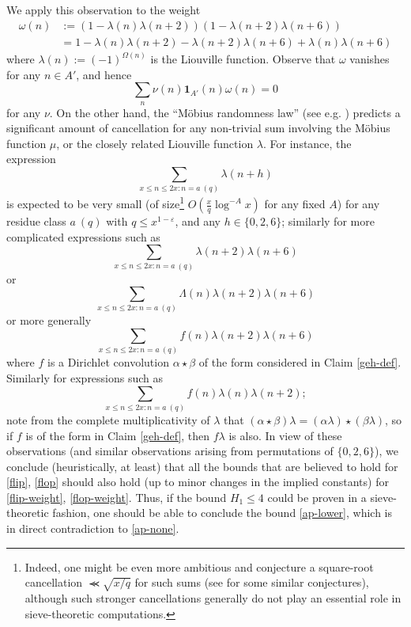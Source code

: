 \documentclass{bmcart}
\theoremstyle{plain}
\theoremstyle{definition}
\newcommand\eps{\varepsilon}
\renewcommand{\lessapprox}{\llcurly}
\newcommand{\onef}{\mathbf{1}}
\begin{document}
We apply this observation to the weight
\begin{align*}
\omega(n) &:= (1 - \lambda(n) \lambda(n+2)) (1 - \lambda(n+2) \lambda(n+6)) \\
&=  1 - \lambda(n)\lambda(n+2) - \lambda(n+2)\lambda(n+6) + \lambda(n) \lambda(n+6)
\end{align*}
where $\lambda(n) := (-1)^{\Omega(n)}$ is the Liouville function.  Observe that $\omega$ vanishes for any $n\in A'$, and hence
\begin{equation}\label{ap-none}
\sum_n \nu(n) \onef_{A'}(n) \omega(n) = 0
\end{equation}
for any $\nu$.  On the other hand, the ``M\"obius randomness law'' (see e.g. \cite{ik}) predicts a significant amount of cancellation for any non-trivial sum involving the M\"obius function $\mu$, or the closely related Liouville function $\lambda$.  For instance, the expression
$$ \sum_{x \leq n \leq 2x: n = a\ (q)} \lambda(n+h)$$
is expected to be very small (of size\footnote{Indeed, one might be even more ambitious and conjecture a square-root cancellation $\lessapprox \sqrt{x/q}$ for such sums (see \cite{mont} for some similar conjectures), although such stronger cancellations generally do not play an essential role in sieve-theoretic computations.} $O( \frac{x}{q} \log^{-A} x)$ for any fixed $A$) for any residue class $a\ (q)$ with $q \leq x^{1-\eps}$, and any $h \in \{0,2,6\}$; similarly for more complicated expressions such as
$$ \sum_{x \leq n \leq 2x: n = a\ (q)} \lambda(n+2) \lambda(n+6)$$
or
$$ \sum_{x \leq n \leq 2x: n = a\ (q)} \Lambda(n) \lambda(n+2) \lambda(n+6)$$
or more generally
$$ \sum_{x \leq n \leq 2x: n = a\ (q)} f(n) \lambda(n+2) \lambda(n+6)$$
where $f$ is a Dirichlet convolution $\alpha \star \beta$ of the form considered in Claim \ref{geh-def}.  Similarly for expressions such as
$$ \sum_{x \leq n \leq 2x: n = a\ (q)} f(n) \lambda(n) \lambda(n+2);$$
note from the complete multiplicativity of $\lambda$ that $(\alpha \star \beta) \lambda = (\alpha \lambda) \star (\beta \lambda)$, so if $f$ is of the form in Claim \ref{geh-def}, then $f\lambda$ is also.  In view of these observations (and similar observations arising from permutations of $\{0,2,6\}$), we conclude (heuristically, at least) that all the bounds that are believed to hold for \eqref{flip}, \eqref{flop} should also hold (up to minor changes in the implied constants) for \eqref{flip-weight}, \eqref{flop-weight}.  Thus, if the bound $H_1 \leq 4$ could be proven in a sieve-theoretic fashion, one should be able to conclude the bound \eqref{ap-lower}, which is in direct contradiction to \eqref{ap-none}.
\end{document}
